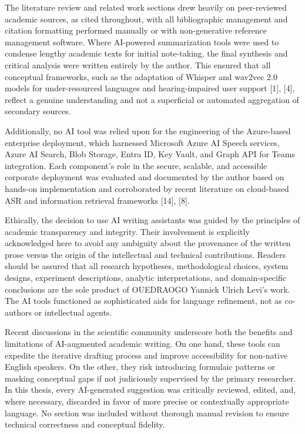 \documentclass[12pt,a4paper]{article}
\begin{document}
The literature review and related work sections drew heavily on peer-reviewed academic sources, as cited throughout, with all bibliographic management and citation formatting performed manually or with non-generative reference management software. Where AI-powered summarization tools were used to condense lengthy academic texts for initial note-taking, the final synthesis and critical analysis were written entirely by the author. This ensured that all conceptual frameworks, such as the adaptation of Whisper and wav2vec 2.0 models for under-resourced languages and hearing-impaired user support [1], [4], reflect a genuine understanding and not a superficial or automated aggregation of secondary sources.


Additionally, no AI tool was relied upon for the engineering of the Azure-based enterprise deployment, which harnessed Microsoft Azure AI Speech services, Azure AI Search, Blob Storage, Entra ID, Key Vault, and Graph API for Teams integration. Each component’s role in the secure, scalable, and accessible corporate deployment was evaluated and documented by the author based on hands-on implementation and corroborated by recent literature on cloud-based ASR and information retrieval frameworks [14], [8].


Ethically, the decision to use AI writing assistants was guided by the principles of academic transparency and integrity. Their involvement is explicitly acknowledged here to avoid any ambiguity about the provenance of the written prose versus the origin of the intellectual and technical contributions. Readers should be assured that all research hypotheses, methodological choices, system designs, experiment descriptions, analytic interpretations, and domain-specific conclusions are the sole product of OUEDRAOGO Yannick Ulrich Levi’s work. The AI tools functioned as sophisticated aids for language refinement, not as co-authors or intellectual agents.


Recent discussions in the scientific community underscore both the benefits and limitations of AI-augmented academic writing. On one hand, these tools can expedite the iterative drafting process and improve accessibility for non-native English speakers. On the other, they risk introducing formulaic patterns or masking conceptual gaps if not judiciously supervised by the primary researcher. In this thesis, every AI-generated suggestion was critically reviewed, edited, and, where necessary, discarded in favor of more precise or contextually appropriate language. No section was included without thorough manual revision to ensure technical correctness and conceptual fidelity.
\end{document}
